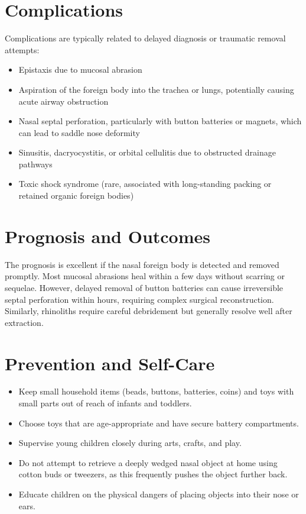 \section*{Complications}
Complications are typically related to delayed diagnosis or traumatic removal attempts:
\begin{itemize}
    \item Epistaxis due to mucosal abrasion
    \item Aspiration of the foreign body into the trachea or lungs, potentially causing acute airway obstruction
    \item Nasal septal perforation, particularly with button batteries or magnets, which can lead to saddle nose deformity
    \item Sinusitis, dacryocystitis, or orbital cellulitis due to obstructed drainage pathways
    \item Toxic shock syndrome (rare, associated with long-standing packing or retained organic foreign bodies)
\end{itemize}

\section*{Prognosis and Outcomes}
The prognosis is excellent if the nasal foreign body is detected and removed promptly. Most mucosal abrasions heal within a few days without scarring or sequelae. However, delayed removal of button batteries can cause irreversible septal perforation within hours, requiring complex surgical reconstruction. Similarly, rhinoliths require careful debridement but generally resolve well after extraction.

\section*{Prevention and Self-Care}
\begin{itemize}
    \item Keep small household items (beads, buttons, batteries, coins) and toys with small parts out of reach of infants and toddlers.
    \item Choose toys that are age-appropriate and have secure battery compartments.
    \item Supervise young children closely during arts, crafts, and play.
    \item Do not attempt to retrieve a deeply wedged nasal object at home using cotton buds or tweezers, as this frequently pushes the object further back.
    \item Educate children on the physical dangers of placing objects into their nose or ears.
\end{itemize}

